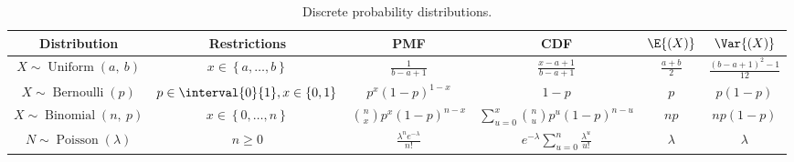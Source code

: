 \documentclass{article}
\begin{document}
\begin{table}[H]
    \centering
    \begin{tabular}{c c c c c c}
        \toprule
        \textbf{Distribution}                                      & \textbf{Restrictions}                                  & \textbf{PMF}                                              & \textbf{CDF}                                                             & \(\E{\left( X \right)}\)            & \(\Var{\left( X \right)}\)                    \\
        \midrule
        \(X \sim \operatorname{Uniform}{\left( a,\: b \right)}\)   & \(x \in \left\{ a, \dots, b \right\}\)                 & \(\frac{1}{b - a + 1}\)                                   & \(\frac{x - a + 1}{b - a + 1}\)                                          & \(\frac{a + b}{2}\)                 & \(\frac{\left( b - a + 1 \right)^2 - 1}{12}\) \\
        \(X \sim \operatorname{Bernoulli}{\left( p \right)}\)      & \(p \in \interval{0}{1}, x \in \left\{ 0, 1 \right\}\) & \(p^x \left( 1 - p \right)^{1 - x}\)                      & \(1 - p\)                                                                & \(p\)                               & \(p \left( 1 - p \right)\)                    \\
        \(X \sim \operatorname{Binomial}{\left( n,\: p \right)}\)  & \(x \in \left\{ 0, \dots, n \right\}\)                 & \(\binom{n}{x} p^x \left( 1 - p \right)^{n - x}\)         & \(\sum_{u = 0}^x \binom{n}{u} p^u \left( 1 - p \right)^{n - u}\)         & \(np\)                              & \(np\left( 1 - p \right)\)                    \\
        \( N \sim \operatorname{Poisson}{\left( \lambda \right)}\) & \(n \geq 0\)                                           & \(\frac{\lambda^n e^{-\lambda}}{n!}\)                     & \(e^{-\lambda} \sum_{u = 0}^n \frac{\lambda^u}{u!}\)                     & \(\lambda\)                         & \(\lambda\)                                   \\
        \bottomrule
    \end{tabular}
    \caption{Discrete probability distributions.} %
\end{table}
\end{document}
